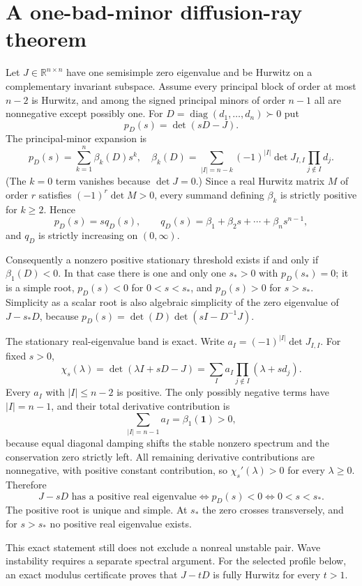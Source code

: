 \section*{A one-bad-minor diffusion-ray theorem}
Let $J\in\mathbb R^{n\times n}$ have one semisimple zero eigenvalue and be
Hurwitz on a complementary invariant subspace.  Assume every principal block
of order at most $n-2$ is Hurwitz, and among the signed principal minors of
order $n-1$ all are nonnegative except possibly one.  For $D=\operatorname{diag}(d_1,\ldots,d_n)
\succ0$ put
\[
p_D(s)=\det(sD-J).
\]
The principal-minor expansion is
\[
p_D(s)=\sum_{k=1}^{n}\beta_k(D)s^k,
\quad
\beta_k(D)=\sum_{|I|=n-k}(-1)^{|I|}\det J_{I,I}
                 \prod_{j\notin I}d_j.
\]
(The $k=0$ term vanishes because $\det J=0$.)  Since a real Hurwitz matrix $M$
of order $r$ satisfies $(-1)^r\det M>0$, every summand defining $\beta_k$ is
strictly positive for $k\ge2$.  Hence
\[
p_D(s)=s q_D(s),\qquad
q_D(s)=\beta_1+\beta_2s+\cdots+\beta_ns^{n-1},
\]
and $q_D$ is strictly increasing on $(0,\infty)$.

Consequently a nonzero positive stationary threshold exists if and only if
$\beta_1(D)<0$.  In that case there is one and only one $s_*>0$ with
$p_D(s_*)=0$; it is a simple root, $p_D(s)<0$ for $0<s<s_*$, and
$p_D(s)>0$ for $s>s_*$.  Simplicity as a scalar root is also algebraic
simplicity of the zero eigenvalue of $J-s_*D$, because
$p_D(s)=\det(D)\det(sI-D^{-1}J)$.

The stationary real-eigenvalue band is exact.  Write
$a_I=(-1)^{|I|}\det J_{I,I}$.  For fixed $s>0$,
\[
\chi_s(\lambda)=\det(\lambda I+sD-J)
=\sum_I a_I\prod_{j\notin I}(\lambda+sd_j).
\]
Every $a_I$ with $|I|\le n-2$ is positive.  The only possibly negative terms
have $|I|=n-1$, and their total derivative contribution is
\[
\sum_{|I|=n-1}a_I=\beta_1(\mathbf 1)>0,
\]
because equal diagonal damping shifts the stable nonzero spectrum and the
conservation zero strictly left.  All remaining derivative contributions are
nonnegative, with positive constant contribution, so
$\chi_s'(\lambda)>0$ for every $\lambda\ge0$.  Therefore
\[
J-sD\text{ has a positive real eigenvalue}
\iff p_D(s)<0
\iff 0<s<s_*.
\]
The positive root is unique and simple.  At $s_*$ the zero crosses
transversely, and for $s>s_*$ no positive real eigenvalue exists.

This exact statement still does not exclude a nonreal unstable pair.  Wave
instability requires a separate spectral argument.  For the selected profile
below, an exact modulus certificate proves that $J-tD$ is fully Hurwitz for
every $t>1$.
